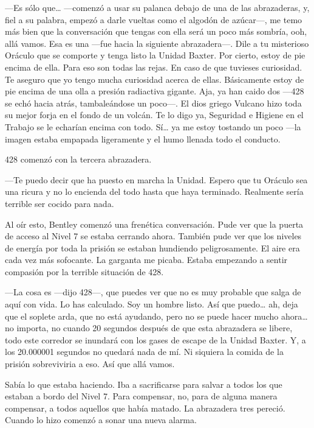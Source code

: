 ---Es sólo que\ldots{} ---comenzó a usar su palanca debajo de una de las
abrazaderas, y, fiel a su palabra, empezó a darle vueltas como el
algodón de azúcar---, me temo más bien que la conversación que tengas
con ella será un poco más sombría, ooh, allá vamos. Esa es una ---fue
hacia la siguiente abrazadera---. Dile a tu misterioso Oráculo que se
comporte y tenga listo la Unidad Baxter. Por cierto, estoy de pie encima
de ella. Para eso son todas las rejas. En caso de que tuvieses
curiosidad. Te aseguro que yo tengo mucha curiosidad acerca de ellas.
Básicamente estoy de pie encima de una olla a presión radiactiva
gigante. Aja, ya han caido dos ---428 se echó hacia atrás, tambaleándose
un poco---. El dios griego Vulcano hizo toda su mejor forja en el fondo
de un volcán. Te lo digo ya, Seguridad e Higiene en el Trabajo se le
echarían encima con todo. Sí\ldots{} ya me estoy tostando un poco ---la
imagen estaba empapada ligeramente y el humo llenada todo el conducto.

428 comenzó con la tercera abrazadera.

---Te puedo decir que ha puesto en marcha la Unidad. Espero que tu
Oráculo sea una ricura y no lo encienda del todo hasta que haya
terminado. Realmente sería terrible ser cocido para nada.

Al oír esto, Bentley comenzó una frenética conversación. Pude ver que la
puerta de acceso al Nivel 7 se estaba cerrando ahora. También pude ver
que los niveles de energía por toda la prisión se estaban hundiendo
peligrosamente. El aire era cada vez más sofocante. La garganta me
picaba. Estaba empezando a sentir compasión por la terrible situación de
428.

---La cosa es ---dijo 428---, que puedes ver que no es muy probable que
salga de aquí con vida. Lo has calculado. Soy un hombre listo. Así que
puedo\ldots{} ah, deja que el soplete arda, que no está ayudando, pero
no se puede hacer mucho ahora\ldots{} no importa, no cuando 20 segundos
después de que esta abrazadera se libere, todo este corredor se inundará
con los gases de escape de la Unidad Baxter. Y, a los 20.000001 segundos
no quedará nada de mí. Ni siquiera la comida de la prisión sobreviviria
a eso. Así que allá vamos.

Sabía lo que estaba haciendo. Iba a sacrificarse para salvar a todos los
que estaban a bordo del Nivel 7. Para compensar, no, para de alguna
manera compensar, a todos aquellos que había matado. La abrazadera tres
pereció. Cuando lo hizo comenzó a sonar una nueva alarma.

